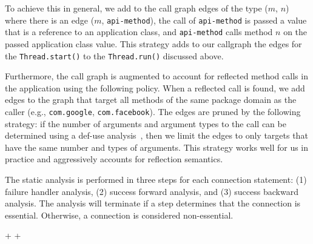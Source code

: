 To achieve this in general, we add to the call graph edges of the type
($m$, $n$) where there is an edge ($m$, \lstinline!api-method!), the
call of \lstinline!api-method! is passed a value that is a reference
to an application class, and \lstinline!api-method! calls method $n$
on the passed application class value.  This strategy adds to our
callgraph the edges for the \lstinline!Thread.start()! to the
\lstinline!Thread.run()! discussed above.

Furthermore, the call graph is augmented to account for reflected
method calls in the application using the following policy.  When a
reflected call is found, we add edges to the graph that target all
methods of the same package domain as the caller (e.g.,
\lstinline!com.google!, \lstinline!com.facebook!).  The edges are pruned by the
following strategy: if the number of arguments and argument types to
the call can be determined using a def-use analysis~\cite{Aho2006},
then we limit the edges to only targets that have the same number and
types of arguments.  This strategy works well for us in
practice and aggressively accounts for reflection semantics.

The static analysis is performed in three steps for each connection
statement: (1) failure handler analysis, (2) success forward analysis,
and (3) success backward analysis.  The analysis will terminate if a
step determines that the connection is essential. Otherwise, a
connection is considered non-essential.

\lstDeleteShortInline+
\lstMakeShortInline[basicstyle=\scriptsize\ttfamily,keywordstyle=\color{DarkPurple},breaklines=true]+

